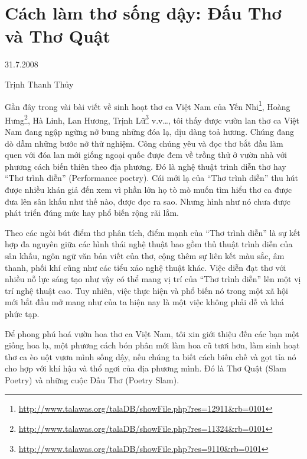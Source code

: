 \documentclass[../main.tex]{subfiles}
\begin{document}
\chapter{Cách làm thơ sống dậy: Đấu Thơ và Thơ Quật}

\begin{metadata}

\begin{flushright}31.7.2008\end{flushright}

Trịnh Thanh Thủy



\end{metadata}

\begin{multicols}{2}

Gần đây trong vài bài viết về sinh hoạt thơ ca Việt Nam của Yến Nhi\footnote{\url{http://www.talawas.org/talaDB/showFile.php?res=12911&rb=0101}}, Hoàng Hưng\footnote{\url{http://www.talawas.org/talaDB/showFile.php?res=11324&rb=0101}}, Hà Linh, Lan Hương, Trịnh Lữ\footnote{\url{http://www.talawas.org/talaDB/showFile.php?res=9110&rb=0101}} v.v…, tôi thấy được vườn lan thơ ca Việt Nam đang ngập ngừng nở bung những đóa lạ, dịu dàng toả hương. Chúng đang dò dẫm những bước nở thử nghiệm. Công chúng yêu và đọc thơ bắt đầu làm quen với đóa lan mới giống ngoại quốc được đem về trồng thử ở vườn nhà với phương cách biến thiên theo địa phương. Đó là nghệ thuật trình diễn thơ hay “Thơ trình diễn” (Performance poetry). Cái mới lạ của “Thơ trình diễn” thu hút được nhiều khán giả đến xem vì phần lớn họ tò mò muốn tìm hiểu thơ ca được đưa lên sân khấu như thế nào, được đọc ra sao. Nhưng hình như nó chưa được phát triển đúng mức hay phổ biến rộng rãi lắm.  
 
Theo các ngòi bút điểm thơ phân tích, điểm mạnh của “Thơ trình diễn” là sự kết hợp đa nguyên giữa các hình thái nghệ thuật bao gồm thủ thuật trình diễn của sân khấu, ngôn ngữ văn bản viết của thơ, cộng thêm sự liên kết màu sắc, âm thanh, phối khí cũng như các tiểu xảo nghệ thuật khác. Việc diễn đạt thơ với nhiều nỗ lực sáng tạo như vậy có thể mang vị trí của “Thơ trình diễn” lên một vị trí nghệ thuật cao. Tuy nhiên, việc thực hiện và phổ biến nó trong một xã hội mới bắt đầu mở mang như của ta hiện nay là một việc không phải dễ và khá phức tạp. 
 
Để phong phú hoá vườn hoa thơ ca Việt Nam, tôi xin giới thiệu đến các bạn một giống hoa lạ, một phương cách bón phân mới làm hoa cũ tươi hơn, làm sinh hoạt thơ ca èo uột vươn mình sống dậy, nếu chúng ta biết cách biến chế và gọt tỉa nó cho hợp với khí hậu và thổ ngơi của địa phương mình.  Đó là Thơ Quật (Slam Poetry) và những cuộc Đấu Thơ (Poetry Slam). 
 

\end{multicols}
\end{document}
